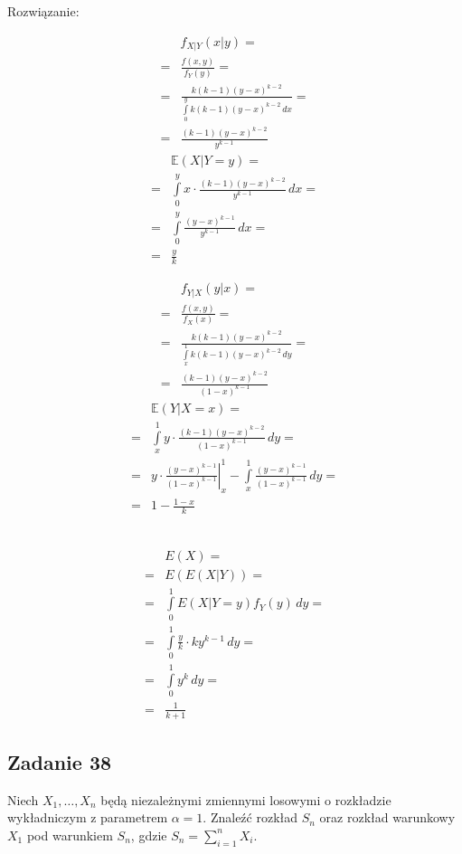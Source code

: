 Rozwiązanie:\\
\begin{minipage}[t]{0.5\linewidth}
\begin{align*}
&f_{X|Y}(x|y)
=\\=&
\frac{f(x,y)}{f_Y(y)}
=\\=&
\frac{k(k-1)(y-x)^{k-2}}{\int\limits_{0}^{y}k(k-1)(y-x)^{k-2}\,dx}
=\\=&
\frac{(k-1)(y-x)^{k-2}}{y^{k-1}}
\end{align*}
\begin{align*}
&\mathbb E \left(X|Y=y\right)
=\\=&
\int\limits_{0}^{y}
x\cdot\frac{(k-1)(y-x)^{k-2}}{y^{k-1}}
\,dx
=\\=&
\int\limits_{0}^{y}
\frac{(y-x)^{k-1}}{y^{k-1}}
\,dx
=\\=&
\frac{y}{k}
\end{align*}
\end{minipage}
\begin{minipage}[t]{0.5\linewidth}
\begin{align*}
&f_{Y|X}(y|x)
=\\=&
\frac{f(x,y)}{f_X(x)}
=\\=&
\frac{k(k-1)(y-x)^{k-2}}{\int\limits_{x}^{1}k(k-1)(y-x)^{k-2}\,dy}
=\\=&
\frac{(k-1)(y-x)^{k-2}}{(1-x)^{k-1}}
\end{align*}
\begin{align*}
&\mathbb E \left(Y|X=x\right)
=\\=&
\int\limits_{x}^{1}
y\cdot \frac{(k-1)(y-x)^{k-2}}{(1-x)^{k-1}}
\,dy
=\\=&
\left .y\cdot \frac{(y-x)^{k-1}}{(1-x)^{k-1}}\right |_x^1
-
\int\limits_{x}^{1}
\frac{(y-x)^{k-1}}{(1-x)^{k-1}}
\,dy
=\\=&
1-\frac{1-x}{k}
\end{align*}
\end{minipage}\\
\begin{align*}
&E\left(X\right)
=\\=&
E\left(E\left(X|Y\right)\right)
=\\=&
\int\limits_{0}^{1}E\left(X|Y=y\right)f_Y(y)\,dy
=\\=&
\int\limits_{0}^{1}\frac{y}{k}\cdot ky^{k-1}\,dy
=\\=&
\int\limits_{0}^{1}y^k\,dy
=\\=&
\frac{1}{k+1}
\end{align*}


\subsection*{Zadanie 38}
Niech $ X_1,\dots,X_n$ będą niezależnymi zmiennymi losowymi o rozkładzie wykładniczym z parametrem $ \alpha=1 $. Znaleźć rozkład $ S_n $ oraz rozkład warunkowy $ X_1 $ pod warunkiem $ S_n $, gdzie $ S_n=\sum_{i=1}^{n}X_i $.

